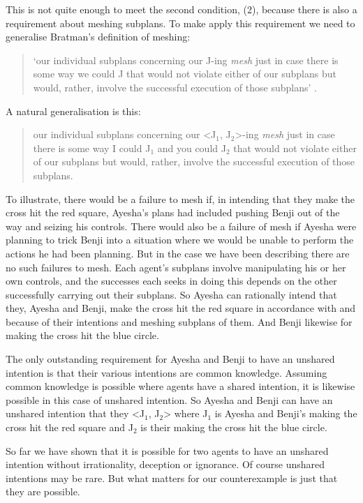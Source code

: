 \documentclass[12pt,\papersize]{extarticle}
\begin{document}
This is not quite enough to meet the second condition, (2), because there is also a requirement about meshing subplans. 
To make apply this requirement we need to generalise Bratman's definition of meshing:
\begin{quote}
`our individual subplans concerning our J-ing \emph{mesh} just in case there is some way we could J that would not violate either of our subplans but would, rather, involve the successful execution of those subplans' \citep[p.\ 106]{Bratman:1993je}.
\end{quote}
A natural generalisation is this:
\begin{quote}
our individual subplans concerning our <J$_1$, J$_2$>-ing \emph{mesh} just in case there is some way I could J$_1$ and you could J$_2$ that would not violate either of our subplans but would, rather, involve the successful execution of those subplans. 
\end{quote}
%
To illustrate, 
there would be a failure to mesh if, in intending that they make the cross hit the red square,  Ayesha's plans had included pushing Benji out of the way and seizing his controls. 
There would also be a failure of mesh if Ayesha were planning to trick Benji into a situation where we would be unable to perform the actions he had been planning.
But in the case we have been describing there are no such failures to mesh.
Each agent's subplans involve manipulating his or her own controls,
and the successes each seeks in doing this depends on the other successfully carrying out their subplans.
So Ayesha can rationally intend that they, Ayesha and Benji, make the cross hit the red square in accordance with and because of their intentions and meshing subplans of them.
And Benji likewise for making the cross hit the blue circle.

The only outstanding requirement for Ayesha and Benji to have an unshared intention is that their various intentions are common knowledge. 
Assuming common knowledge is possible where agents have a shared intention, it is likewise possible in this case of unshared intention.
So Ayesha and Benji can have an unshared intention that they <J$_1$, J$_2$> where J$_1$ is Ayesha and Benji's making the cross hit the red square and J$_2$ is their making the cross hit the blue circle.

So far we have shown that it is possible for two agents to have an unshared intention without irrationality, deception or ignorance.
Of course unshared intentions may be rare. 
But what matters for our counterexample is just that they are possible. 
\end{document}
